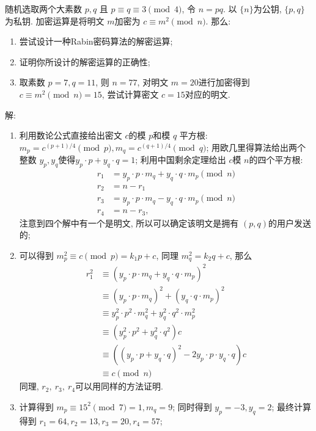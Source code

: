 \documentclass[a4paper,12pt]{ctexart}
\begin{document}
    随机选取两个大素数 $ p,q $ 且 $ p\equiv q\equiv 3\pmod{4} $, 令 $ n=pq $. 以 $\{n\}$为公钥, $ \{p,q\} $为私钥. 加密运算是将明文 $ m $加密为 $ c\equiv m^2\pmod{n} $.  那么:
    \begin{enumerate}[label=(\arabic*)]
        \item 尝试设计一种Rabin密码算法的解密运算;
        \item 证明你所设计的解密运算的正确性;
        \item 取素数 $ p=7,q=11 $, 则 $ n=77 $, 对明文 $ m=20 $进行加密得到 $ c\equiv m^2\pmod{n}=15 $, 尝试计算密文 $ c=15 $对应的明文.
    \end{enumerate}
    解:\begin{enumerate}[label=(\arabic*)]
        \item 利用数论公式直接给出密文 $ c $的模 $ p $和模 $ q $ 平方根: $ m_p=c^{(p+1)/4}\pmod{p},m_q=c^{(q+1)/4}\pmod{q} $; 用欧几里得算法给出两个整数 $ y_p,y_q $使得$ y_p\cdot p+y_q\cdot q=1 $; 利用中国剩余定理给出 $ c $模 $ n $的四个平方根:
            \begin{align*}
                r_1&=y_p\cdot p\cdot m_q+y_q\cdot q\cdot m_p\pmod{n}\\
                r_2&=n-r_1\\
                r_3&=y_p\cdot p\cdot m_q-y_q\cdot q\cdot m_p\pmod{n}\\
                r_4&=n-r_3, 
            \end{align*}
        注意到四个解中有一个是明文, 所以可以确定该明文是拥有 $ (p,q) $的用户发送的; 

        \item 可以得到 $ m_p^2\equiv c\pmod{p}=k_1p+c $, 同理 $ m_q^2=k_2q+c $, 那么
        \begin{align*}
            r_1^2&\equiv(y_p\cdot p\cdot m_q+y_q\cdot q\cdot m_p)^2\\
            &\equiv(y_p\cdot p\cdot m_q)^2+(y_q\cdot q\cdot m_p)^2\\
            &\equiv y_p^2\cdot p^2\cdot m_q^2+y_q^2\cdot q^2\cdot m_p^2\\
            &\equiv (y_p^2\cdot p^2+y_q^2\cdot q^2)c\\
            &\equiv ((y_p\cdot p+y_q\cdot q)^2-2y_p\cdot p\cdot y_q\cdot q)c\\
            &\equiv c\pmod{n}
        \end{align*}
        同理, $ r_2,~r_3,~r_4 $可以用同样的方法证明. 
        \item 计算得到 $ m_p\equiv 15^2\pmod{7}=1,m_q=9 $; 同时得到 $ y_p=-3,y_q=2 $; 最终计算得到 $ r_1=64,r_2=13,r_3=20,r_4=57 $;
    \end{enumerate}
\end{document}
